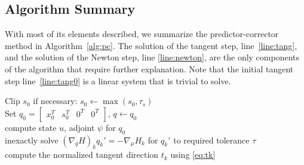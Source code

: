\subsection{Algorithm Summary}

With most of its elements described, we summarize the predictor-corrector method
in Algorithm~\ref{alg:pc}.  The solution of the tangent step,
line~\ref{line:tang}, and the solution of the Newton step, line
\ref{line:newton}, are the only components of the algorithm that require further
explanation.  Note that the initial tangent step line~\ref{line:tang0} is a linear system that 
is trivial to solve. %
\\
\LinesNumberedHidden
\begin{algorithm}[H]
\SetEndCharOfAlgoLine{}

\BlankLine
Clip $s_0$ if necessary: $s_0 \leftarrow \max(s_0,\tau_s)$  \\
Set $q_0 = \begin{bmatrix} x_0^T & s_0^T& 0^T & 0^T \end{bmatrix}$, $q  \leftarrow q_0 $  \\
compute state $u$,  adjoint $\psi$ for $q_0$ \\
\ShowLn
inexactly solve $\left(\nabla_q H\right)_{k} q_{k}' = - \nabla_\mu H_{k} $ \label{line:tang0}   
 for $q_{k}'$ to required tolerance $\tau$ \label{line:initPred} \\
compute the normalized tangent direction $t_{k}$ using \eqref{eq:tk} \\

\end{algorithm}
